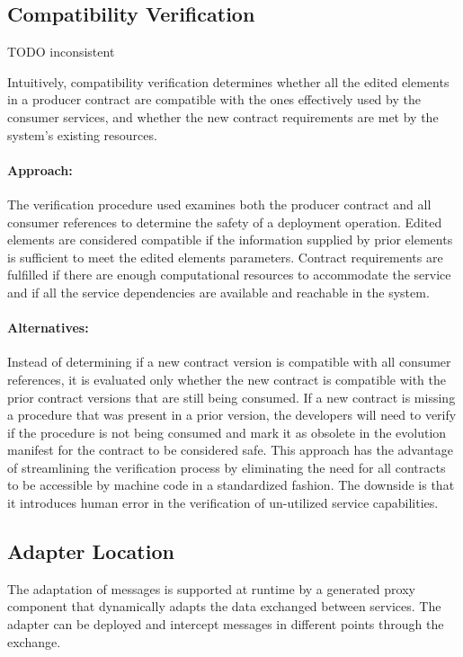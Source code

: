 \subsection{Compatibility Verification} %
\label{sec:compatibility_verification_design}

TODO inconsistent

Intuitively, compatibility verification determines whether
all the edited elements in a producer contract are compatible with the ones effectively
used by the consumer services, and whether the new contract requirements are met
by the system’s existing resources.

\paragraph{Approach:}
The verification procedure used examines both the producer contract and all consumer references to determine the safety of a deployment operation.
Edited elements are considered compatible if the information supplied by prior elements is sufficient to meet the edited elements parameters.
Contract requirements are fulfilled if there are enough computational resources to accommodate the service and if all the
service dependencies are available and reachable in the system.

\paragraph{Alternatives:}
Instead of determining if a new contract version is compatible with all consumer references,
it is evaluated only whether the new contract is compatible with the prior contract versions that are still being consumed.
If a new contract is missing a procedure that was present in a prior version,
the developers will need to verify if the procedure is not being consumed
and mark it as obsolete in the evolution manifest for the contract to be considered safe.
This approach has the advantage of streamlining the verification process by eliminating the
need for all contracts to be accessible by machine code in a standardized fashion.
The downside is that it introduces human error in the verification of un-utilized service capabilities.

\subsection{Adapter Location} %
\label{sec:adapter_location}

The adaptation of messages is supported at runtime by a generated proxy component
that dynamically adapts the data exchanged between services.
The adapter can be deployed and intercept messages in different points through the exchange.

